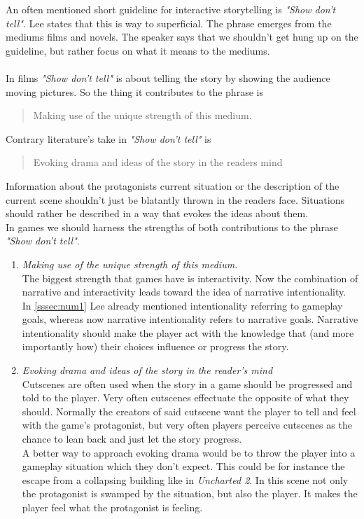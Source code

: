 \documentclass[a4paper]{article}
\begin{document}
An often mentioned short guideline for interactive storytelling is \textit{"Show don't tell"}. Lee states that this is way to superficial. The phrase emerges from the mediums films and novels. The speaker says that we shouldn't get hung up on the guideline, but rather focus on what it means to the mediums.\\ \\
In films \textit{"Show don't tell"} is about telling the story by showing the audience moving pictures. So the thing it contributes to the phrase is \begin{quote}Making use of the unique strength of this medium.\end{quote}
Contrary literature's take in \textit{"Show don't tell"} is \begin{quote}Evoking drama and ideas of the story in the readers mind\end{quote} Information about the protagonists current situation or the description of the current scene shouldn't just be blatantly thrown in the readers face. Situations should rather be described in a way that evokes the ideas about them. \\
In games we should harness the strengths of both contributions to the phrase \textit{"Show don't tell"}.
\begin{enumerate}
\item \textit{Making use of the unique strength of this medium.}\\
The biggest strength that games have is interactivity. Now the combination of narrative and interactivity leads toward the idea of narrative intentionality. \\ In \ref{sssec:num1} Lee already mentioned intentionality referring to gameplay goals, whereas now narrative intentionality refers to narrative goals. Narrative intentionality should make the player act with the knowledge that (and more importantly how) their choices influence or progress the story.
\item \textit{Evoking drama and ideas of the story in the reader's mind}\\
Cutscenes are often used when the story in a game should be progressed and told to the player. Very often cutscenes effectuate the opposite of what they should. Normally the creators of said cutscene want the player to tell and feel with the game's protagonist, but very often players perceive cutscenes as the chance to lean back and just let the story progress. \\
A better way to approach evoking drama would be to throw the player into a gameplay situation which they don't expect. This could be for instance the escape from a collapsing building like in \textit{Uncharted 2}. In this scene not only the protagonist is swamped by the situation, but also the player. It makes the player feel what the protagonist is feeling.
\end{enumerate}
\end{document}
